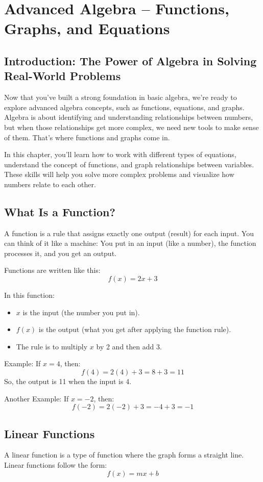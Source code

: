 
\chapter{Advanced Algebra – Functions, Graphs, and Equations}

\section{Introduction: The Power of Algebra in Solving Real-World Problems}
Now that you’ve built a strong foundation in basic algebra, we’re ready to explore advanced algebra concepts, such as functions, equations, and graphs. Algebra is about identifying and understanding relationships between numbers, but when those relationships get more complex, we need new tools to make sense of them. That’s where functions and graphs come in.

In this chapter, you’ll learn how to work with different types of equations, understand the concept of functions, and graph relationships between variables. These skills will help you solve more complex problems and visualize how numbers relate to each other.

\section{What Is a Function?}
A function is a rule that assigns exactly one output (result) for each input. You can think of it like a machine: You put in an input (like a number), the function processes it, and you get an output.

Functions are written like this:
\[ f(x) = 2x + 3 \]

In this function:
\begin{itemize}
    \item \( x \) is the input (the number you put in).
    \item \( f(x) \) is the output (what you get after applying the function rule).
    \item The rule is to multiply \( x \) by 2 and then add 3.
\end{itemize}

Example: If \( x = 4 \), then:
\[ f(4) = 2(4) + 3 = 8 + 3 = 11 \]
So, the output is 11 when the input is 4.

Another Example: If \( x = -2 \), then:
\[ f(-2) = 2(-2) + 3 = -4 + 3 = -1 \]

\section{Linear Functions}
A linear function is a type of function where the graph forms a straight line. Linear functions follow the form:
\[ f(x) = mx + b \]



